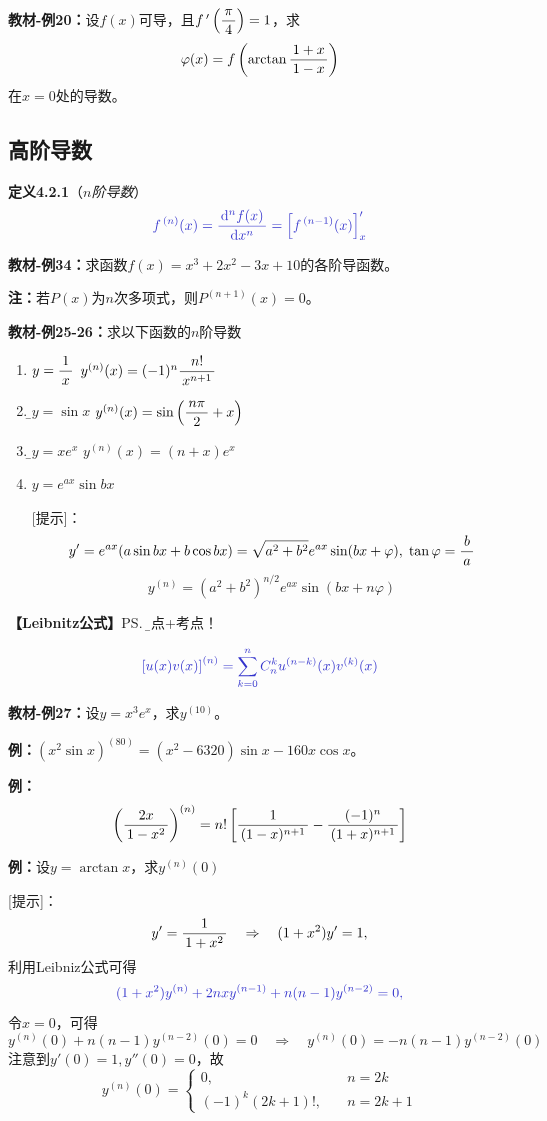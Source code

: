 {\bf 教材-例20：}设$f(x)$可导，且$f\,'\left(\displaystyle\frac{\,{\pi}\,}{\,{4}\,}\right)=1$，求
$$\varphi(x)=f\left(\arctan\displaystyle\frac{\,{1+x}\,}{\,{1-x}\,}\right)$$
在$x=0$处的导数。

\subsection{高阶导数}

{\bf 定义4.2.1}（{\it $n$阶导数}）
$${\b f^{\,(n)}(x)=\df{\d^nf(x)}{\d x^n}=\left[f^{\,(n-1)}(x)\right]'_x}$$

{\bf 教材-例34：}求函数$f(x)=x^3+2x^2-3x+10$的各阶导函数。

{\bf 注：}若$P(x)$为$n$次多项式，则$P^{(n+1)}(x)=0$。

{\bf 教材-例25-26：}求以下函数的$n$阶导数
\begin{enumerate}[(1)]
  \setlength{\itemindent}{1cm}
  \item $y=\displaystyle\frac{\,{1}\,}{\,{x}\,}$ \hfill $y^{(n)}(x)=(-1)^n\displaystyle\frac{\,{n!}\,}{\,{x^{n+1}}\,}$ 
  \item {\b$y=\sin x$ \hfill
  $y^{(n)}(x)=\sin\left(\displaystyle\frac{\,{n\pi}\,}{\,{2}\,}+x\right)$} 
  \item {\b$y=xe^x$ \hfill $y^{(n)}(x)=(n+x)e^x$}
  \item $y=e^{ax}\sin bx$

[提示]：
$$y'=e^{ax}(a\sin bx+b\cos
bx)=\sqrt{a^2+b^2}e^{ax}\sin(bx+\varphi),
\;\tan\varphi=\displaystyle\frac{\,{b}\,}{\,{a}\,}$$
$$y^{(n)}=\left(a^2+b^2\right)^{n/2}e^{ax}\sin(bx+n\varphi)$$ 
\end{enumerate}

{\bf 【Leibnitz公式】}\ps{\b 难点+考点！}

$${\b{\left[u(x)v(x)\right]^{(n)}=
\sum\limits_{k=0}^nC_n^ku^{(n-k)}(x)v^{(k)}(x)}}$$

{\bf 教材-例27：}设$y=x^3e^x$，求$y^{(10)}$。

{\bf 例：}$(x^2\sin x)^{(80)}=(x^2-6320)\sin x-160x\cos x$。

{\bf 例：}
$$\left(\displaystyle\frac{\,{2x}\,}{\,{1-x^2}\,}\right)^{(n)}=n!\left[\displaystyle\frac{\,{1}\,}{\,{(1-x)^{n+1}}\,}
-\displaystyle\frac{\,{(-1)^n}\,}{\,{(1+x)^{n+1}}\,}\right]$$

{\bf 例：}设$y=\arctan x$，求$y^{(n)}(0)$

[提示]：
$$y'=\displaystyle\frac{\,{1}\,}{\,{1+x^2}\,}\quad \Rightarrow\quad (1+x^2)y'=1,$$
利用Leibniz公式可得
$${\b (1+x^2)y^{(n)}+2nxy^{(n-1)}+n(n-1)y^{(n-2)}=0,}$$
令$x=0$，可得
$$y^{(n)}(0)+n(n-1)y^{(n-2)}(0)=0\quad
\Rightarrow\quad y^{(n)}(0)=-n(n-1)y^{(n-2)}(0)$$
注意到$y'(0)=1,y''(0)=0$，故
$$y^{(n)}(0)=\left\{\begin{array}{ll}
0,\quad& n=2k\\
(-1)^k(2k+1)!,\quad& n=2k+1
\end{array}\right.$$

